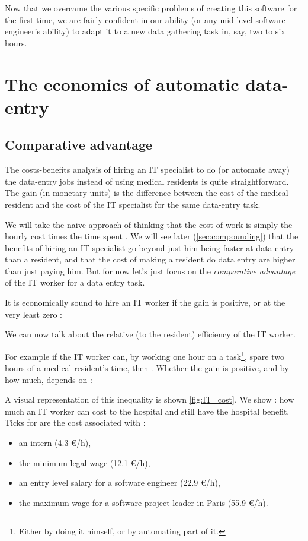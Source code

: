 \documentclass[nobib]{tufte-handout}
\begin{document}
Now that we overcame the various specific problems of creating this software for the first time, we are fairly confident in our ability (or any mid-level software engineer's ability) to adapt it to a new data gathering task in, say, two to six hours.


\section{The economics of automatic data-entry}
\label{sec:economics}

\subsection{Comparative advantage}
\label{sec:comparative}

The costs-benefits analysis of hiring an IT specialist to do (or automate away) the data-entry jobs instead of using medical residents is quite straightforward. The gain (in monetary units) is the difference between the cost of the medical resident  and the cost of the IT specialist  for the same data-entry task.



We will take the naive approach of thinking that the cost of work is simply the hourly cost  times the time spent . We will see later (\autoref{sec:compounding}) that the benefits of hiring an IT specialist go beyond just him being faster at data-entry than a resident, and that the cost of making a resident do data entry are higher than just paying him. But for now let's just focus on the \emph{comparative advantage} \cite[27-36]{economics} of the IT worker for a data entry task.



It is economically sound to hire an IT worker if the gain  is positive, or at the very least zero :


We can now talk about the relative (to the resident) efficiency  of the IT worker.

For example if the IT worker can, by working one hour on a task\footnote{Either by doing it himself, or by automating part of it.}, spare two hours of a medical resident's time, then . Whether the gain  is positive, and by how much, depends on  :


A visual representation of this inequality is shown \autoref{fig:IT_cost}. We show  : how much an IT worker can cost to the hospital and still have the hospital benefit. Ticks for  are the cost associated with \cite{salaires} :
\begin{itemize}
\item an intern (4.3 €/h),
\item the minimum legal wage (12.1 €/h), 
\item an entry level salary for a software engineer (22.9 €/h),
\item the maximum wage for a software project leader in Paris (55.9 €/h).
\end{itemize}
\end{document}
